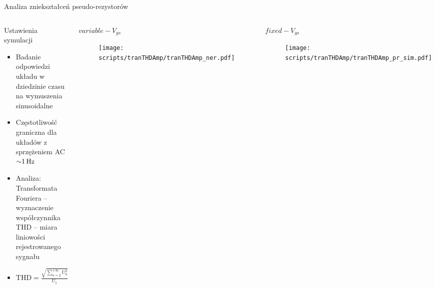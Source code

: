 \begin{frame}{Analiza zniekształceń pseudo-rezystorów}
    \vspace{-1em}



    \begin{columns}
        \begin{block}{Ustawienia symulacji}
            \begin{itemize}
                \item Badanie odpowiedzi układu  w dziedzinie czasu na wymuszenia sinusoidalne
                \item Częstotliwość graniczna dla układów z sprzężeniem AC $\SI{\sim 1}{\hertz}$
                \item Analiza: Transformata Fouriera -- wyznaczenie współczynnika THD -- miara liniowości rejestrowanego sygnału
                \item $\mathrm{THD} = \frac{\sqrt{\sum_{n=2}^{+\infty} U_k^2}}{U_1}$
            \end{itemize}
                \end{block}
        \vspace{-1em} %
        \begin{alertblock}{$variable-V_{gs}$}
        \begin{figure}[H]
            \centering
            \texttt{[image: scripts/tranTHDAmp/tranTHDAmp\_ner.pdf]}
        \end{figure}
    \end{alertblock}
        \vspace{-1em} %
        \begin{exampleblock}{$fixed-V_{gs}$}
        \begin{figure}[H]
            \centering
            \texttt{[image: scripts/tranTHDAmp/tranTHDAmp\_pr\_sim.pdf]}
        \end{figure}
    \end{exampleblock}
    \end{columns}

\end{frame}




